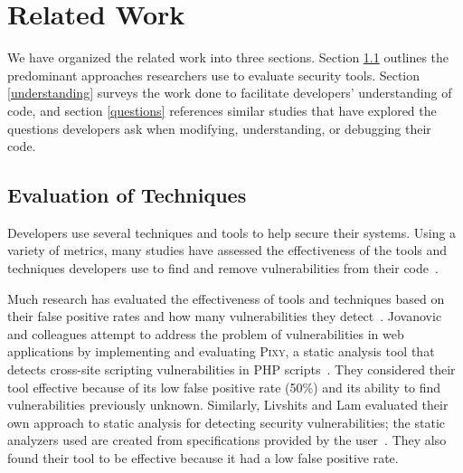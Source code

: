 \documentclass[conference]{IEEEtran}
\begin{document}
%



\section{Related Work}
\label{sec:rw}

We have organized the related work into three sections. Section \ref{evaluation} outlines the predominant approaches researchers use to evaluate security tools. 
Section \ref{understanding} surveys the work done to facilitate developers' understanding of code, and section \ref{questions} references similar studies that have explored the questions developers ask when modifying, understanding, or debugging their code.

\subsection{Evaluation of Techniques}
\label{evaluation}
Developers use several techniques and tools to help secure their systems.
Using a variety of metrics, many studies have assessed the effectiveness of the tools and techniques developers use to find and remove vulnerabilities from their code~\cite{martin2005finding, austin2011one, livshits2005finding}.  

Much research has evaluated the effectiveness of tools and techniques based on their false positive rates and how many vulnerabilities they detect~\cite{jovanovic2006pixy, austin2011one, dukes2013case}. 
Jovanovic and colleagues attempt to address the problem of vulnerabilities in web applications by implementing and evaluating \textsc{Pixy}, a static analysis tool that detects cross-site scripting vulnerabilities in PHP scripts~\cite{jovanovic2006pixy}. 
They considered their tool effective because of its low false positive rate (50\%) and its ability to find vulnerabilities previously unknown. 
Similarly, Livshits and Lam evaluated their own approach to static analysis for detecting security vulnerabilities; the static analyzers used are created from specifications provided by the user~\cite{livshits2005finding}. 
They also found their tool to be effective because it had a low false positive rate. 
\end{document}
